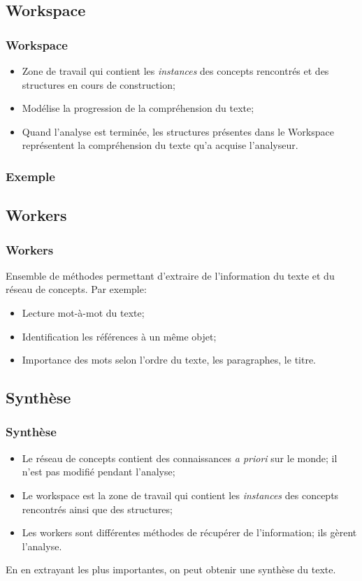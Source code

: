 \documentclass{beamer}
\begin{document}
    \subsection{Workspace}
        \begin{frame}
        \frametitle{Workspace}
            \begin{itemize}
                \item Zone de travail qui contient les \textit{instances} des concepts rencontrés et des structures en cours de construction;
                \item Modélise la progression de la compréhension du texte;
                \item Quand l'analyse est terminée, les structures présentes dans le Workspace représentent la compréhension du texte qu'a acquise l'analyseur.
            \end{itemize}
        \end{frame}

        \begin{frame}
        \frametitle{Exemple}
        \end{frame}

    \subsection{Workers}
        \begin{frame}
        \frametitle{Workers}
            Ensemble de méthodes permettant d'extraire de l'information du texte et du réseau de concepts.\newline{}
            Par exemple:
            \begin{itemize}
                \item Lecture mot-à-mot du texte;
                \item Identification les références à un même objet;
                \item Importance des mots selon l'ordre du texte, les paragraphes, le titre.
            \end{itemize}
        \end{frame}

    \subsection{Synthèse}
        \begin{frame}
        \frametitle{Synthèse}
            \begin{itemize}
                \item Le réseau de concepts contient des connaissances \textit{a priori} sur le monde; il n'est pas modifié pendant l'analyse;
                \item Le workspace est la zone de travail qui contient les \textit{instances} des concepts rencontrés ainsi que des structures;
                \item Les workers sont différentes méthodes de récupérer de l'information; ils gèrent l'analyse.
            \end{itemize}

            En en extrayant les plus importantes, on peut obtenir une synthèse du texte.
        \end{frame}
\end{document}
